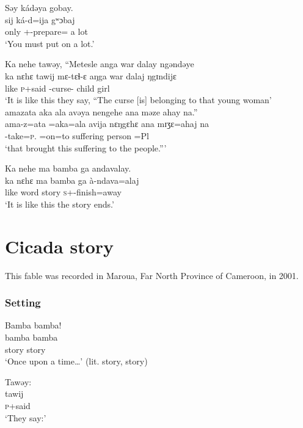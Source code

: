  \ea  Səy  kádəya  gobay.\\
 \gll sij ká-d=ija  gʷɔbaj\\
 only    {\twoS}+{\IFV}-prepare={\PLU}   {a lot}\\
 \glt ‘You must put on a lot.’\\
 \z
 
 \ea  Ka  nehe  tawəy,  “Metesle  anga  war  dalay  ngəndəye  \\
\gll ka  nɛhɛ  tawij  mɛ-tɛɬ-ɛ      aŋga  war    dalaj  ŋgɪndijɛ \\
 like  {\DEM}   \textsc{p}+said  {\NOM}{}-curse-{\CL}   {\POSS}   child  girl       {\DEM}      \\
 \glt ‘It is like this they say, “The curse [is] belonging to that young woman’\\
 
 \medskip
  amazata  aka  ala  avəya  nengehe  ana  məze  ahay  na.”\\
\gll ama-z=ata      =aka=ala      avija    nɛŋgɛhɛ  ana    mɪʒɛ=ahaj   na\\
 {\DEP}-take=\textsc{p}.{\IO}   =on=to  suffering  {\DEM}      {\DAT} person    =Pl  {\PSP}\\
 \glt ‘that brought this suffering to the people.”’ 
 \z

 \ea  Ka  nehe  ma  bamba  ga  andavalay.    \\
 \gll ka  nɛhɛ  ma  bamba   ga  à-ndava=alaj\\
 like  {\DEM}  word   story     {\ADJ}     \textsc{s}+{\PFV}-finish=away \\
 \glt ‘It is like this the story ends.’  
 \z
 
% 
\section[Cicada story]{Cicada story}\setcounter{equation}{0}\label{sec:1.6}
\hypertarget{RefHeading1210361525720847}{}
This fable was recorded in Maroua, Far North Province of Cameroon, in 2001.  
% 
\subsubsection*{Setting}
\ea   Bamba  bamba!\\
\gll bamba   bamba\\
	        story         story   \\
\glt ‘Once upon a time…’ (lit. story, story)
 \z

\ea Tawəy: \\
\gll   tawij \\
\textsc{p}+said  \\  
\glt ‘They say:’
  \z

